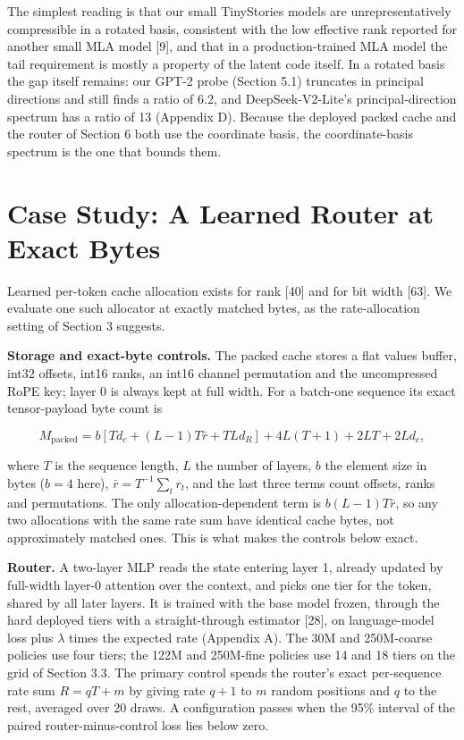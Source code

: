 \documentclass[11pt]{article}
\begin{document}
The simplest reading is that our small TinyStories models are unrepresentatively compressible in a rotated basis, consistent with the low effective rank reported for another small MLA model [9], and that in a production-trained MLA model the tail requirement is mostly a property of the latent code itself. In a rotated basis the gap itself remains: our GPT-2 probe (Section 5.1) truncates in principal directions and still finds a ratio of 6.2, and DeepSeek-V2-Lite's principal-direction spectrum has a ratio of 13 (Appendix D). Because the deployed packed cache and the router of Section 6 both use the coordinate basis, the coordinate-basis spectrum is the one that bounds them.

\section{Case Study: A Learned Router at Exact Bytes}

Learned per-token cache allocation exists for rank [40] and for bit width [63]. We evaluate one such allocator at exactly matched bytes, as the rate-allocation setting of Section 3 suggests.

\textbf{Storage and exact-byte controls.} The packed cache stores a flat values buffer, int32 offsets, int16 ranks, an int16 channel permutation and the uncompressed RoPE key; layer 0 is always kept at full width. For a batch-one sequence its exact tensor-payload byte count is

\[M_{\text{packed}}=
b\left[Td_c+(L-1)T\bar r+TLd_R\right]
+4L(T+1)+2LT+2Ld_c,\]

where $T$ is the sequence length, $L$ the number of layers, $b$ the element size in bytes ($b=4$ here), $\bar r=T^{-1}\sum_t r_t$, and the last three terms count offsets, ranks and permutations. The only allocation-dependent term is $b(L-1)T\bar r$, so any two allocations with the same rate sum have identical cache bytes, not approximately matched ones. This is what makes the controls below exact.

\textbf{Router.} A two-layer MLP reads the state entering layer 1, already updated by full-width layer-0 attention over the context, and picks one tier for the token, shared by all later layers. It is trained with the base model frozen, through the hard deployed tiers with a straight-through estimator [28], on language-model loss plus $\lambda$ times the expected rate (Appendix A). The 30M and 250M-coarse policies use four tiers; the 122M and 250M-fine policies use 14 and 18 tiers on the grid of Section 3.3. The primary control spends the router's exact per-sequence rate sum $R=qT+m$ by giving rate $q+1$ to $m$ random positions and $q$ to the rest, averaged over 20 draws. A configuration passes when the 95\% interval of the paired router-minus-control loss lies below zero.
\end{document}

